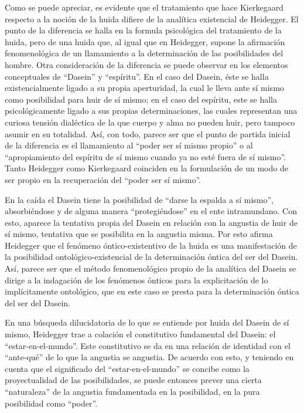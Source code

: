 \documentclass[]{article}
\begin{document}
Como se puede apreciar, es evidente que el tratamiento que hace Kierkegaard respecto a la noción de la huida difiere de la analítica existencial de Heidegger. El punto de la diferencia se halla en la formula psicológica del tratamiento de la huida, pero de una huida que, al igual que en Heidegger, supone la afirmación fenomenológica de un llamamiento a la determinación de las posibilidades del hombre. Otra consideración de la diferencia se puede observar en los elementos conceptuales de ``Dasein'' y ``espíritu''. En el caso del Dasein, éste se halla existencialmente ligado a su propia aperturidad, la cual le lleva ante sí mismo como posibilidad para huir de sí mismo; en el caso del espíritu, este se halla psicológicamente ligado a sus propias determinaciones, las cuales representan una curiosa tensión dialéctica de la que cuerpo y alma no pueden huir, pero tampoco asumir en su totalidad. Así, con todo, parece ser que el punto de partida inicial de la diferencia es el llamamiento al ``poder ser sí mismo propio'' o al ``apropiamiento del espíritu de sí mismo cuando ya no esté fuera de sí mismo''. Tanto Heidegger como Kierkegaard coinciden en la formulación de un modo de ser propio en la recuperación del ``poder ser sí mismo''.

En la caída el Dasein tiene la posibilidad de ``darse la espalda a sí mismo'', absorbiéndose y de alguna manera ``protegiéndose'' en el ente intramundano. Con esto, aparece la tentativa propia del Dasein en relación con la angustia de huir de sí mismo, tentativa que se posibilita en la angustia misma. Por esto afirma Heidegger que el fenómeno óntico-existentivo de la huida es una manifestación de la posibilidad ontológico-existencial de la determinación óntica del ser del Dasein. Así, parece ser que el método fenomenológico propio de la analítica del Dasein se dirige a la indagación de los fenómenos ónticos para la explicitación de lo implícitamente ontológico, que en este caso se presta para la determinación óntica del ser del Dasein.

En una búsqueda dilucidatoria de lo que se entiende por huida del Dasein de sí mismo, Heidegger trae a colación el constitutivo fundamental del Dasein: el ``estar-en-el-mundo''. Este constitutivo se da en una relación de identidad con el ``ante-qué'' de lo que la angustia se angustia. De acuerdo con esto, y teniendo en cuenta que el significado del ``estar-en-el-mundo'' se concibe como la proyectualidad de las posibilidades, se puede entonces prever una cierta ``naturaleza'' de la angustia fundamentada en la posibilidad, en la pura posibilidad como ``poder''.
\end{document}
